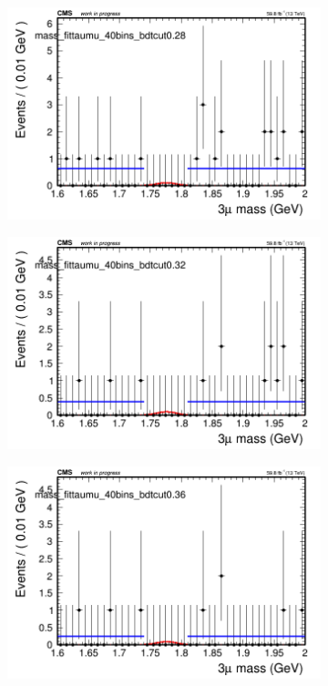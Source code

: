\begin{figure}[H]
\begin{subfigure}{0.2\textwidth}
        \caption{}
    \end{subfigure}
    \begin{subfigure}{0.2\textwidth}
        \includegraphics[width=\textwidth]{flat_fit/plots/taumu/massfit_taumu_40bins_bdtcut0.28.png}
        \caption{}
    \end{subfigure}
    \begin{subfigure}{0.2\textwidth}
        \includegraphics[width=\textwidth]{flat_fit/plots/taumu/massfit_taumu_40bins_bdtcut0.32.png}
        \caption{}
    \end{subfigure}
    \begin{subfigure}{0.2\textwidth}
        \includegraphics[width=\textwidth]{flat_fit/plots/taumu/massfit_taumu_40bins_bdtcut0.36.png}

\end{subfigure}
\end{figure}
